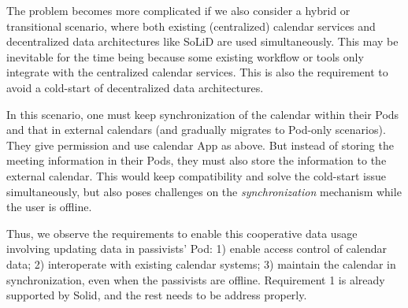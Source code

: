 \documentclass[
twocolumn,
]{ceurart}
\newcommand{\tA}{\emph} %
\newcommand{\aA}{\tA{Alice}}
\newcommand{\aB}{\tA{Bob}}
\begin{document}
The problem becomes more complicated if we also consider a hybrid or transitional scenario, where both existing (centralized) calendar services and decentralized data architectures like SoLiD are used simultaneously. This may be inevitable for the time being because some existing workflow or tools only integrate with the centralized calendar services. This is also the requirement to avoid a cold-start of decentralized data architectures.

In this scenario, one must keep synchronization of the calendar within their Pods and that in external calendars (and gradually migrates to Pod-only scenarios). They give permission and use calendar App as above. But instead of storing the meeting information in their Pods, they must also store the information to the external calendar. This would keep compatibility and solve the cold-start issue simultaneously, but also poses challenges on the \emph{synchronization} mechanism while the user is offline.

Thus, we observe the requirements to enable this cooperative data usage involving updating data in passivists' Pod: 1) enable access control of calendar data; 2) interoperate with existing calendar systems; 3) maintain the calendar in synchronization, even when the passivists are offline. Requirement 1 is already supported by Solid, and the rest needs to be address properly.


\end{document}
